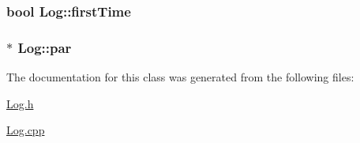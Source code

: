 \subsubsection[{first\+Time}]{\setlength{\rightskip}{0pt plus 5cm}bool Log\+::first\+Time\hspace{0.3cm}{\ttfamily [private]}}\label{class_log_ae36e5bdf60626170e5d1d726a23509e5}
\hypertarget{class_log_a5b11d7e5e4e4afcbe0f57bae791e3a0a}{}
\subsubsection[{par}]{$\ast$ Log\+::par\hspace{0.3cm}{\ttfamily [private]}}\label{class_log_a5b11d7e5e4e4afcbe0f57bae791e3a0a}


The documentation for this class was generated from the following files\+:\begin{DoxyCompactItemize}
\item 
\hyperlink{_log_8h}{Log.\+h}\item 
\hyperlink{_log_8cpp}{Log.\+cpp}\end{DoxyCompactItemize}
